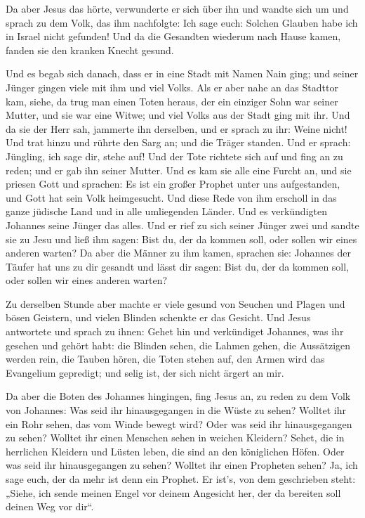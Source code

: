  Da aber Jesus das hörte, verwunderte er sich über ihn und
wandte sich um und sprach zu dem Volk, das ihm nachfolgte: Ich sage
euch: Solchen Glauben habe ich in Israel nicht gefunden! 
Und da die Gesandten wiederum nach Hause kamen, fanden sie den kranken
Knecht gesund.

 Und es begab sich danach, dass er in eine Stadt mit
Namen Nain ging; und seiner Jünger gingen viele mit ihm und viel Volks.
 Als er aber nahe an das Stadttor kam, siehe, da trug man
einen Toten heraus, der ein einziger Sohn war seiner Mutter, und sie war
eine Witwe; und viel Volks aus der Stadt ging mit ihr. 
Und da sie der Herr sah, jammerte ihn derselben, und er sprach zu ihr:
Weine nicht!  Und trat hinzu und rührte den Sarg an; und
die Träger standen. Und er sprach: Jüngling, ich sage dir, stehe auf!
 Und der Tote richtete sich auf und fing an zu reden; und
er gab ihn seiner Mutter.  Und es kam sie alle eine
Furcht an, und sie priesen Gott und sprachen: Es ist ein großer Prophet
unter uns aufgestanden, und Gott hat sein Volk heimgesucht.
 Und diese Rede von ihm erscholl in das ganze jüdische
Land und in alle umliegenden Länder.  Und es verkündigten
Johannes seine Jünger das alles. Und er rief zu sich seiner Jünger zwei
 und sandte sie zu Jesu und ließ ihm sagen: Bist du, der
da kommen soll, oder sollen wir eines anderen warten?  Da
aber die Männer zu ihm kamen, sprachen sie: Johannes der Täufer hat uns
zu dir gesandt und lässt dir sagen: Bist du, der da kommen soll, oder
sollen wir eines anderen warten?

 Zu derselben Stunde aber machte er viele gesund von
Seuchen und Plagen und bösen Geistern, und vielen Blinden schenkte er
das Gesicht.  Und Jesus antwortete und sprach zu ihnen:
Gehet hin und verkündiget Johannes, was ihr gesehen und gehört habt: die
Blinden sehen, die Lahmen gehen, die Aussätzigen werden rein, die Tauben
hören, die Toten stehen auf, den Armen wird das Evangelium gepredigt;
 und selig ist, der sich nicht ärgert an mir.

 Da aber die Boten des Johannes hingingen, fing Jesus an,
zu reden zu dem Volk von Johannes: Was seid ihr hinausgegangen in die
Wüste zu sehen? Wolltet ihr ein Rohr sehen, das vom Winde bewegt wird?
 Oder was seid ihr hinausgegangen zu sehen? Wolltet ihr
einen Menschen sehen in weichen Kleidern? Sehet, die in herrlichen
Kleidern und Lüsten leben, die sind an den königlichen Höfen.
 Oder was seid ihr hinausgegangen zu sehen? Wolltet ihr
einen Propheten sehen? Ja, ich sage euch, der da mehr ist denn ein
Prophet.  Er ist's, von dem geschrieben steht: „Siehe,
ich sende meinen Engel vor deinem Angesicht her, der da bereiten soll
deinen Weg vor dir``.

